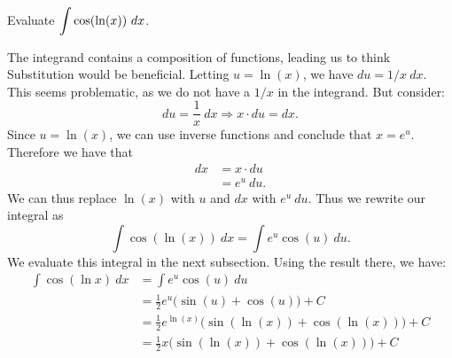 \begin{example} \label{eg:5.1.3} %
Evaluate $\displaystyle \int \cos(\ln(x))\ dx$.

\solution
The integrand contains a composition of functions, leading us to think Substitution would be beneficial. Letting $u=\ln(x)$, we have $du = 1/x\ dx$. This seems problematic, as we do not have a $1/x$ in the integrand. But consider:
$$du = \frac 1x\ dx \Rightarrow x\cdot du = dx.$$
Since $u = \ln(x)$, we can use inverse functions and conclude that $x = e^u$. Therefore we have that
\begin{align*}
dx &= x\cdot du \\
		&= e^u\ du.
\end{align*}
We can thus replace $\ln(x)$ with $u$ and $dx$ with $e^u\ du$. Thus we rewrite our integral as 
$$\int \cos(\ln(x))\ dx = \int e^u\cos (u) \ du.$$
We evaluate this integral in the next subsection. Using the result there, we have:
\begin{align*}
\int \cos(\ln x)\ dx &= \int e^u\cos (u) \ du \\
				&= \frac12e^u\big(\sin (u) + \cos (u)\big) + C \\
				&= \frac12e^{\ln(x)} \big(\sin(\ln(x)) + \cos (\ln(x))\big)+C\\
				&= \frac12x \big(\sin(\ln(x)) + \cos (\ln(x))\big)+C
\end{align*}

\end{example}